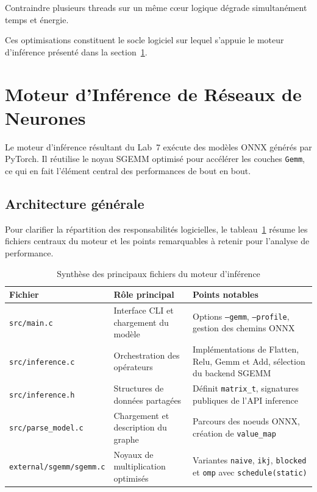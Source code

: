 \documentclass[a4paper,11pt]{article}
\begin{document}
Contraindre plusieurs threads sur un même cœur logique dégrade simultanément temps et énergie.

Ces optimisations constituent le socle logiciel sur lequel s'appuie le moteur d'inférence présenté dans la section~\ref{sec:engine}.

\vspace{2\baselineskip}

\section{Moteur d'Inférence de Réseaux de Neurones}\label{sec:engine}

Le moteur d'inférence résultant du Lab~7 exécute des modèles ONNX générés par PyTorch. Il réutilise le noyau SGEMM optimisé pour accélérer les couches \texttt{Gemm}, ce qui en fait l'élément central des performances de bout en bout.

\subsection{Architecture générale}

Pour clarifier la répartition des responsabilités logicielles, le tableau~\ref{tab:engine-files} résume les fichiers centraux du moteur et les points remarquables à retenir pour l'analyse de performance.

\begin{table}[H]
\centering
\caption{Synthèse des principaux fichiers du moteur d'inférence}
\label{tab:engine-files}
\begin{tabular}{|p{}|p{}|p{}|}
\hline
\textbf{Fichier} & \textbf{Rôle principal} & \textbf{Points notables} \\
\hline
\texttt{src/main.c} & Interface CLI et chargement du modèle & Options \texttt{--gemm}, \texttt{--profile}, gestion des chemins ONNX \\
\hline
\texttt{src/inference.c} & Orchestration des opérateurs & Implémentations de Flatten, Relu, Gemm et Add, sélection du backend SGEMM \\
\hline
\texttt{src/inference.h} & Structures de données partagées & Définit \texttt{matrix\_t}, signatures publiques de l'API inference \\
\hline
\texttt{src/parse\_model.c} & Chargement et description du graphe & Parcours des noeuds ONNX, création de \texttt{value\_map} \\
\hline
\texttt{external/sgemm/\newline sgemm.c} & Noyaux de multiplication optimisés & Variantes \texttt{naive}, \texttt{ikj}, \texttt{blocked} et \texttt{omp} avec \texttt{schedule(static)} \\
\hline
\end{tabular}
\end{table}
\end{document}
